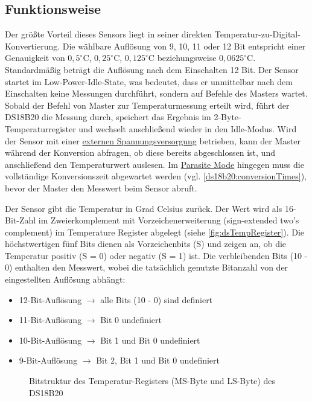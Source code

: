 \subsection{Funktionsweise}
	Der grö{\ss}te Vorteil dieses Sensors liegt in seiner direkten Temperatur-zu-Digital-Konvertierung. Die wählbare Auflösung von 9, 10, 11 oder 12 Bit entspricht einer Genauigkeit von $0{,}5 ^\circ\mathrm{C}$, $0{,}25 ^\circ\mathrm{C}$, $0{,}125 ^\circ\mathrm{C}$ beziehungsweise $0{,}0625 ^\circ\mathrm{C}$. Standardmä{\ss}ig beträgt die Auflösung nach dem Einschalten 12 Bit. Der Sensor startet im Low-Power-Idle-State, was bedeutet, dass er unmittelbar nach dem Einschalten keine Messungen durchführt, sondern auf Befehle des Masters wartet. Sobald der Befehl von Master zur Temperaturmessung erteilt wird, führt der DS18B20 die Messung durch, speichert das Ergebnis im 2-Byte-Temperaturregister und wechselt anschlie{\ss}end wieder in den Idle-Modus.
	Wird der Sensor mit einer \hyperref[lab:extPowered]{externen Spannungsversorgung} betrieben, kann der Master während der Konversion abfragen, ob diese bereits abgeschlossen ist, und anschlie{\ss}end den Temperaturwert auslesen. Im \hyperref[lab:parasiteMode]{Parasite Mode} hingegen muss die vollständige Konversionszeit abgewartet werden (vgl. \autoref{ds18b20:conversionTimes}), bevor der Master den Messwert beim Sensor abruft.
	
	Der Sensor gibt die Temperatur in Grad Celsius zurück. Der Wert wird als 16-Bit-Zahl im Zweierkomplement mit Vorzeichenerweiterung (sign-extended two's complement) im Temperature Register abgelegt (siehe \autoref{fig:dsTempRegister}). Die höchstwertigen fünf Bits dienen als Vorzeichenbits (S) und zeigen an, ob die Temperatur positiv (S = 0) oder negativ (S = 1) ist.
	Die verbleibenden Bits (10 - 0) enthalten den Messwert, wobei die tatsächlich genutzte Bitanzahl von der eingestellten Auflösung abhängt:
	\begin{itemize}
		\item 12-Bit-Auflösung $\rightarrow$ alle Bits (10 - 0) sind definiert
		\item 11-Bit-Auflösung $\rightarrow$ Bit 0 undefiniert
		\item 10-Bit-Auflösung $\rightarrow$ Bit 1 und Bit 0 undefiniert
		\item 9-Bit-Auflösung $\rightarrow$ Bit 2, Bit 1 und Bit 0 undefiniert
	\end{itemize}
	
	\begin{figure}[H]
		\centering
		\resizebox{\textwidth}{!}{%
			\fbox{
				\begin{tikzpicture}
					\dsTempRegisterFormat
				\end{tikzpicture}%
			}
		}
		\caption{Bitstruktur des Temperatur-Registers (MS-Byte und LS-Byte) des DS18B20}
		\label{fig:dsTempRegister}
	\end{figure}

